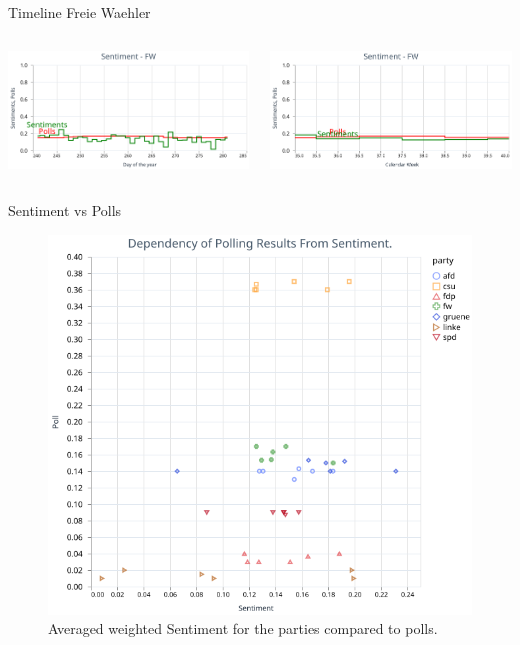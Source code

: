\begin{frame}{Timeline Freie Waehler}
	\begin{columns}
		
		\begin{column}{0.55\textwidth}
			\begin{tcolorbox}[enhanced jigsaw, colback=white, opacityback=.4, colframe=ElixirPurple, arc=3mm, boxrule=0mm, height=0.8\textheight, valign=center, title=Daily]
				\includegraphics[width=\tcbtextwidth]{pictures/paper/comparision/visualization_fw_daily_compare.png}
			\end{tcolorbox}
		\end{column}
		
		\begin{column}{0.55\textwidth}
			\begin{tcolorbox}[enhanced jigsaw, colback=white, opacityback=.4, colframe=ElixirPurple, arc=3mm, boxrule=0mm, height=0.8\textheight, valign=center, title=Weekly]
				\includegraphics[width=\tcbtextwidth]{pictures/paper/comparision/visualization_fw_weekly_compare.png}
			\end{tcolorbox}
		\end{column}
	\end{columns}
\end{frame}

\begin{frame}{Sentiment vs Polls}
	\begin{figure}
		\includegraphics[width=0.5\linewidth]{pictures/paper/comparision/visualization_weekly_compare.png}
		\caption{Averaged weighted Sentiment for the parties compared to polls.}
	\end{figure}
\end{frame}
